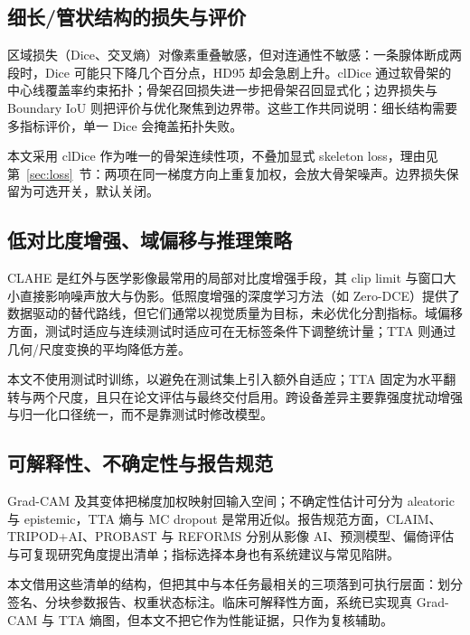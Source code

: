 \subsection{细长/管状结构的损失与评价}

区域损失（Dice、交叉熵）对像素重叠敏感，但对连通性不敏感：一条腺体断成两段时，Dice 可能只下降几个百分点，HD95 却会急剧上升。clDice 通过软骨架的中心线覆盖率约束拓扑\cite{cldice}；骨架召回损失进一步把骨架召回显式化\cite{skeletonrecall}；边界损失与 Boundary IoU 则把评价与优化聚焦到边界带\cite{boundaryloss,boundaryiou}。这些工作共同说明：细长结构需要多指标评价，单一 Dice 会掩盖拓扑失败。

本文采用 clDice 作为唯一的骨架连续性项，不叠加显式 skeleton loss，理由见第~\ref{sec:loss}~节：两项在同一梯度方向上重复加权，会放大骨架噪声。边界损失保留为可选开关，默认关闭。

\subsection{低对比度增强、域偏移与推理策略}

CLAHE 是红外与医学影像最常用的局部对比度增强手段，其 clip limit 与窗口大小直接影响噪声放大与伪影\cite{infraredclahe}。低照度增强的深度学习方法（如 Zero-DCE）提供了数据驱动的替代路线\cite{zerodce,lowlightsurvey}，但它们通常以视觉质量为目标，未必优化分割指标。域偏移方面，测试时适应与连续测试时适应可在无标签条件下调整统计量\cite{tent,cotta}；TTA 则通过几何/尺度变换的平均降低方差\cite{wang2019aleatoric}。

本文不使用测试时训练，以避免在测试集上引入额外自适应；TTA 固定为水平翻转与两个尺度，且只在论文评估与最终交付启用。跨设备差异主要靠强度扰动增强与归一化口径统一，而不是靠测试时修改模型。

\subsection{可解释性、不确定性与报告规范}

Grad-CAM 及其变体把梯度加权映射回输入空间\cite{gradcam,gradcampp,scorecam}；不确定性估计可分为 aleatoric 与 epistemic，TTA 熵与 MC dropout 是常用近似\cite{wang2019aleatoric,uncertaintyreview,phiseg}。报告规范方面，CLAIM、TRIPOD+AI、PROBAST 与 REFORMS 分别从影像 AI、预测模型、偏倚评估与可复现研究角度提出清单\cite{claim2024update,tripodai,probast,reforms}；指标选择本身也有系统建议与常见陷阱\cite{metricsreloaded,metricpitfalls}。

本文借用这些清单的结构，但把其中与本任务最相关的三项落到可执行层面：划分签名、分块参数报告、权重状态标注。临床可解释性方面，系统已实现真 Grad-CAM 与 TTA 熵图，但本文不把它作为性能证据，只作为复核辅助。
